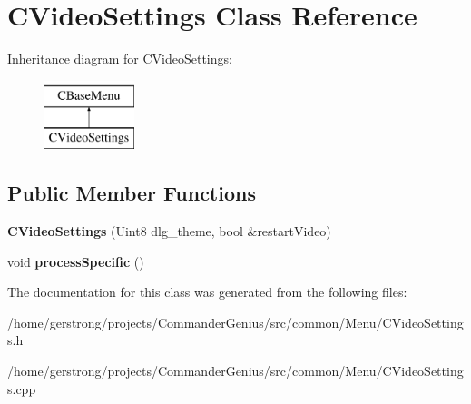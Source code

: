 \hypertarget{class_c_video_settings}{
\section{CVideoSettings Class Reference}
\label{class_c_video_settings}
}
Inheritance diagram for CVideoSettings:\begin{figure}[H]
\begin{center}
\leavevmode
\includegraphics[height=2cm]{class_c_video_settings}
\end{center}
\end{figure}
\subsection*{Public Member Functions}
\begin{DoxyCompactItemize}
\item 
\hypertarget{class_c_video_settings_ad4d97accb1f7258f1a1435315f05ead4}{
{\bfseries CVideoSettings} (Uint8 dlg\_\-theme, bool \&restartVideo)}
\label{class_c_video_settings_ad4d97accb1f7258f1a1435315f05ead4}

\item 
\hypertarget{class_c_video_settings_afd80518e931e6081fe6ea7b52174d7de}{
void {\bfseries processSpecific} ()}
\label{class_c_video_settings_afd80518e931e6081fe6ea7b52174d7de}

\end{DoxyCompactItemize}


The documentation for this class was generated from the following files:\begin{DoxyCompactItemize}
\item 
/home/gerstrong/projects/CommanderGenius/src/common/Menu/CVideoSettings.h\item 
/home/gerstrong/projects/CommanderGenius/src/common/Menu/CVideoSettings.cpp\end{DoxyCompactItemize}
